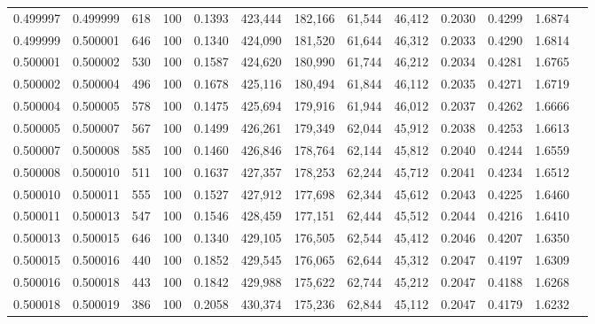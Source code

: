 \begin{tabular}{rrrrrrrrrrrrr}
0.499997 & 0.499999 &   618 & 100 &                                     0.1393 & 423,444 & 182,166 &  61,544 &  46,412 & 0.2030 & 0.4299 & 1.6874 \\
0.499999 & 0.500001 &   646 & 100 &                                     0.1340 & 424,090 & 181,520 &  61,644 &  46,312 & 0.2033 & 0.4290 & 1.6814 \\
0.500001 & 0.500002 &   530 & 100 &                                     0.1587 & 424,620 & 180,990 &  61,744 &  46,212 & 0.2034 & 0.4281 & 1.6765 \\
0.500002 & 0.500004 &   496 & 100 &                                     0.1678 & 425,116 & 180,494 &  61,844 &  46,112 & 0.2035 & 0.4271 & 1.6719 \\
0.500004 & 0.500005 &   578 & 100 &                                     0.1475 & 425,694 & 179,916 &  61,944 &  46,012 & 0.2037 & 0.4262 & 1.6666 \\
0.500005 & 0.500007 &   567 & 100 &                                     0.1499 & 426,261 & 179,349 &  62,044 &  45,912 & 0.2038 & 0.4253 & 1.6613 \\
0.500007 & 0.500008 &   585 & 100 &                                     0.1460 & 426,846 & 178,764 &  62,144 &  45,812 & 0.2040 & 0.4244 & 1.6559 \\
0.500008 & 0.500010 &   511 & 100 &                                     0.1637 & 427,357 & 178,253 &  62,244 &  45,712 & 0.2041 & 0.4234 & 1.6512 \\
0.500010 & 0.500011 &   555 & 100 &                                     0.1527 & 427,912 & 177,698 &  62,344 &  45,612 & 0.2043 & 0.4225 & 1.6460 \\
0.500011 & 0.500013 &   547 & 100 &                                     0.1546 & 428,459 & 177,151 &  62,444 &  45,512 & 0.2044 & 0.4216 & 1.6410 \\
0.500013 & 0.500015 &   646 & 100 &                                     0.1340 & 429,105 & 176,505 &  62,544 &  45,412 & 0.2046 & 0.4207 & 1.6350 \\
0.500015 & 0.500016 &   440 & 100 &                                     0.1852 & 429,545 & 176,065 &  62,644 &  45,312 & 0.2047 & 0.4197 & 1.6309 \\
0.500016 & 0.500018 &   443 & 100 &                                     0.1842 & 429,988 & 175,622 &  62,744 &  45,212 & 0.2047 & 0.4188 & 1.6268 \\
0.500018 & 0.500019 &   386 & 100 &                                     0.2058 & 430,374 & 175,236 &  62,844 &  45,112 & 0.2047 & 0.4179 & 1.6232 \\

\end{tabular}
